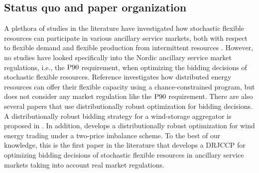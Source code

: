 \documentclass[conference]{IEEEtran}
\begin{document}

\vspace{2mm}
\subsection{Status quo and paper organization}
\vspace{-1mm}
A plethora of studies in the literature have investigated how stochastic flexible resources can participate in various ancillary service markets, both with respect to flexible demand  \cite{bondy2016procedure, bondy2014performance, biegel2014integration, AchievingControllabilityofElectricLoads} and flexible production from intermittent resources \cite{hansen2016provision, ullah2009wind, morey2023comprehensive, alshehri2019modelling}. However, no studies have looked specifically into the Nordic ancillary service market regulations, i.e., the $\rm{P90}$ requirement, when optimizing the bidding decisions of stochastic flexible resources. Reference \cite{zhang2018data} investigates how distributed energy resources can offer their flexible capacity using a chance-constrained program, but does not consider any market regulation like the $\rm{P90}$ requirement. There are also several papers that use distributionally robust optimization for bidding decisions. A distributionally robust bidding strategy for a wind-storage aggregator is proposed in \cite{Hug}. In addition, \cite{pierre} develops a distributionally robust optimization for wind energy trading under a two-price imbalance scheme. To the best of our knowledge, this is the first paper in the literature that develops a \ac{DRJCCP} for optimizing bidding decisions of stochastic flexible resources in ancillary service markets taking into account real market regulations. 


\end{document}
